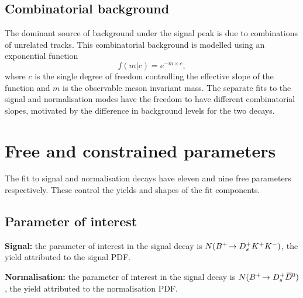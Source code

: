 \subsection{Combinatorial  background}
\label{sec:B2DsKK_combcomps}

The dominant source of background under the signal peak is due to combinations of unrelated tracks. This combinatorial background is modelled using an exponential function 
\begin{equation}
f(m|c) = e^{-m\times c},
\end{equation}
where $c$ is the single degree of freedom controlling the effective slope of the function and $m$ is the observable \Bp meson invariant mass. The separate fits to the signal and normalisation modes have the freedom to have different combinatorial slopes, motivated by the difference in background levels for the two decays.




\section{Free and constrained parameters}


The fit to signal and normalisation decays have eleven and nine free parameters respectively. These control the yields and shapes of the fit components.  
\subsection{Parameter of interest}
\begin{description}
\item \textbf{Signal:} the parameter of interest in the signal decay is $N({{{B}^+}}\!\rightarrow {\ensuremath{{D}^+_{s}}}{\ensuremath{{K}^+}}{\ensuremath{{K}^-}})$, the yield attributed to the signal PDF.

\item \textbf{Normalisation:} the parameter of interest in the signal decay is $N({{{B}^+}}\!\rightarrow {\ensuremath{{D}^+_{s}}}{\ensuremath{{\kern 0.2em\overline{\kern -0.2em D}{}}{}^0}})$, the yield attributed to the normalisation PDF. 

\end{description}


